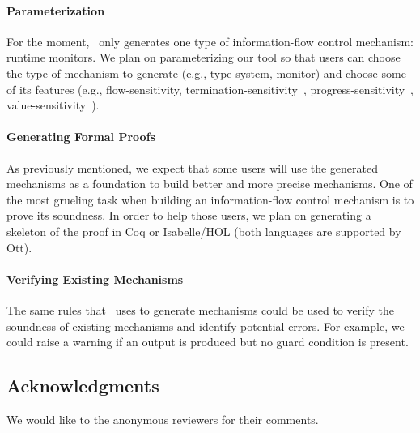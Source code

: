 \documentclass[conference]{IEEEtran}
\begin{document}
\paragraph{Parameterization} For the moment, \ottifc\ only generates one type of information-flow control mechanism: runtime monitors. We plan on parameterizing our tool so that users can choose the type of mechanism to generate (e.g., type system, monitor) and choose some of its features (e.g., flow-sensitivity, termination-sensitivity~\cite{DBLP:conf/esorics/AskarovHSS08}, progress-sensitivity~\cite{DBLP:conf/ccs/MooreAC12}, value-sensitivity~\cite{DBLP:conf/csfw/HedinBS15}).

\paragraph{Generating Formal Proofs} As previously mentioned, we expect that some users will use the generated mechanisms as a foundation to build better and more precise mechanisms. One of the most grueling task when building an information-flow control mechanism is to prove its soundness. In order to help those users, we plan on generating a skeleton of the proof in Coq or Isabelle/HOL (both languages are supported by Ott).

\paragraph{Verifying Existing Mechanisms} The same rules that \ottifc\ uses to generate mechanisms could be used to verify the soundness of existing mechanisms and identify potential errors. For example, we could raise a warning if an output is produced but no guard condition is present.

\subsection*{Acknowledgments}
We would like to the anonymous reviewers for their comments.

\newpage


\end{document}
